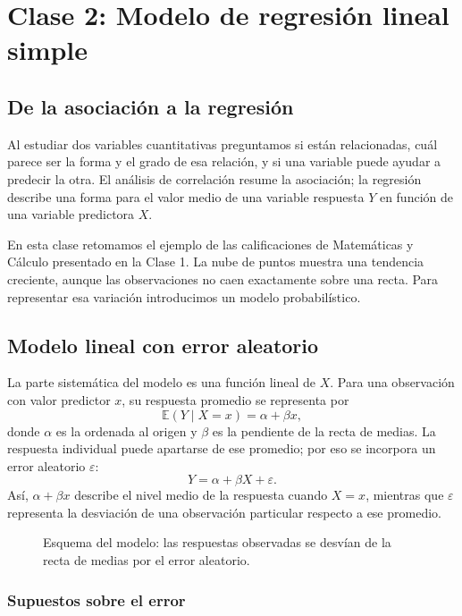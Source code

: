 \chapter{Clase 2: Modelo de regresión lineal simple}

\section{De la asociación a la regresión}

Al estudiar dos variables cuantitativas preguntamos si están relacionadas, cuál parece ser la forma y el grado de esa relación, y si una variable puede ayudar a predecir la otra. El análisis de correlación resume la asociación; la regresión describe una forma para el valor medio de una variable respuesta $Y$ en función de una variable predictora $X$.

En esta clase retomamos el ejemplo de las calificaciones de Matemáticas y Cálculo presentado en la Clase 1. La nube de puntos muestra una tendencia creciente, aunque las observaciones no caen exactamente sobre una recta. Para representar esa variación introducimos un modelo probabilístico.

\section{Modelo lineal con error aleatorio}

La parte sistemática del modelo es una función lineal de $X$. Para una observación con valor predictor $x$, su respuesta promedio se representa por
\[
\mathbb{E}(Y\mid X=x)=\alpha+\beta x,
\]
donde $\alpha$ es la ordenada al origen y $\beta$ es la pendiente de la recta de medias. La respuesta individual puede apartarse de ese promedio; por eso se incorpora un error aleatorio $\varepsilon$:
\[
Y=\alpha+\beta X+\varepsilon.
\]
Así, $\alpha+\beta x$ describe el nivel medio de la respuesta cuando $X=x$, mientras que $\varepsilon$ representa la desviación de una observación particular respecto a ese promedio.

\begin{figure}[H]
\centering

\caption{Esquema del modelo: las respuestas observadas se desvían de la recta de medias por el error aleatorio.}
\label{fig:modelo-lineal-error}
\end{figure}

\subsection{Supuestos sobre el error}

